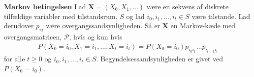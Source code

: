 \begin{minipage}\textwidth
\begin{thmx} \textbf{Markov betingelsen} \label{sæt:markov_tingtang}%
\newline 
Lad $\bm X=(X_0, X_1,\ldots)$ være en sekvens af diskrete tilfældige variabler med tilstandsrum, $S$ og lad $i_0, i_1, \ldots, i_t \in S$ være tilstande. Lad derudover $p_{ij}$ være overgangssandsynligheden. Så er $\bm X$ en Markov-kæde med overgangsmatricen, $\mathcal{P}$, hvis og kun hvis
\begin{align}
    P(X_0=i_0,X_1=i_1,\dots, X_t=i_t)=P(X_0=i_0)p_{i_0i_1}\dots p_{i_{t-1}i_t}\label{markov-kæde-hovedsætning}
\end{align}
for alle $t\geq0$ og $i_0,i_1,\dots,i_t\in S$. Begyndelsessandsynligheden er givet ved $P(X_0 = i_0)$.
\end{thmx}
\end{minipage}
